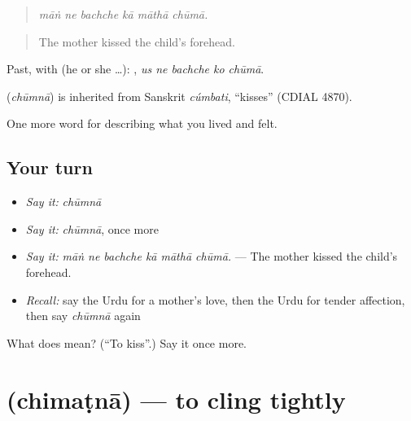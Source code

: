 \begin{quote}
     
\end{quote}

\begin{quote}
\emph{māṅ ne bachche kā māthā chūmā.}
\end{quote}

\begin{quote}
The mother kissed the child's forehead.
\end{quote}

Past, with  (he or she …):     , \emph{us ne bachche ko chūmā}.

\begin{cousinweb}
\textbf{} (\emph{chūmnā}) is inherited from Sanskrit \emph{cúmbati}, \textquotedblleft{}kisses\textquotedblright{} (CDIAL 4870).
\end{cousinweb}

\begin{grammarlens}[title={What you've built}]
One more word for describing what you lived and felt.
\end{grammarlens}

\subsection*{Your turn}
\begin{itemize}
\raggedright
  \item \emph{Say it:} \emph{chūmnā}
  \item \emph{Say it:} \emph{chūmnā}, once more
  \item \emph{Say it:} \emph{māṅ ne bachche kā māthā chūmā.} — The mother kissed the child's forehead.
  \item \emph{Recall:} say the Urdu for a mother's love, then the Urdu for tender affection, then say \emph{chūmnā} again
\end{itemize}

\begin{tcolorbox}[breakable,colback=teal!4,colframe=teal!35!black,title={Before you move on}]
What does  mean? (\textquotedblleft{}To kiss\textquotedblright{}.) Say it once more.
\end{tcolorbox}
\section[\texorpdfstring{\ur{چمٹنا} (chimaṭnā)}{چمٹنا (chimaṭnā)}]{ (chimaṭnā) — to cling tightly}

